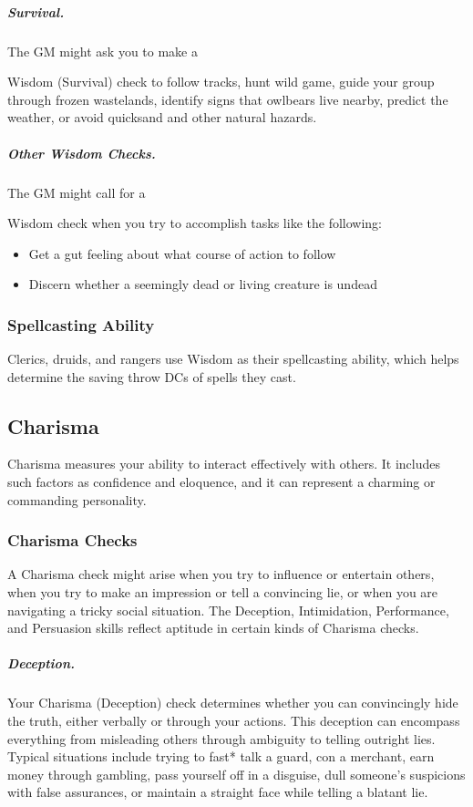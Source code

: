 \subparagraph*{Survival.} The GM might ask you to make a

Wisdom (Survival) check to follow tracks, hunt wild game, guide your group through frozen wastelands, identify signs that owlbears live nearby, predict the weather, or avoid quicksand and other natural hazards.

\subparagraph*{Other Wisdom Checks.} The GM might call for a

Wisdom check when you try to accomplish tasks like the following:

\begin{itemize}
    \item Get a gut feeling about what course of action to follow
    \item Discern whether a seemingly dead or living creature is undead
\end{itemize}

\subsubsection{Spellcasting Ability}

Clerics, druids, and rangers use Wisdom as their spellcasting ability, which helps determine the saving throw DCs of spells they cast.

\subsection{Charisma}

Charisma measures your ability to interact effectively with others. It includes such factors as confidence and eloquence, and it can represent a charming or commanding personality.

\subsubsection{Charisma Checks}

A Charisma check might arise when you try to influence or entertain others, when you try to make an impression or tell a convincing lie, or when you are navigating a tricky social situation. The Deception, Intimidation, Performance, and Persuasion skills reflect aptitude in certain kinds of Charisma checks.

\subparagraph*{Deception.} Your Charisma (Deception) check determines whether you can convincingly hide the truth, either verbally or through your actions. This deception can encompass everything from misleading others through ambiguity to telling outright lies. Typical situations include trying to fast* talk a guard, con a merchant, earn money through gambling, pass yourself off in a disguise, dull someone's suspicions with false assurances, or maintain a straight face while telling a blatant lie.

